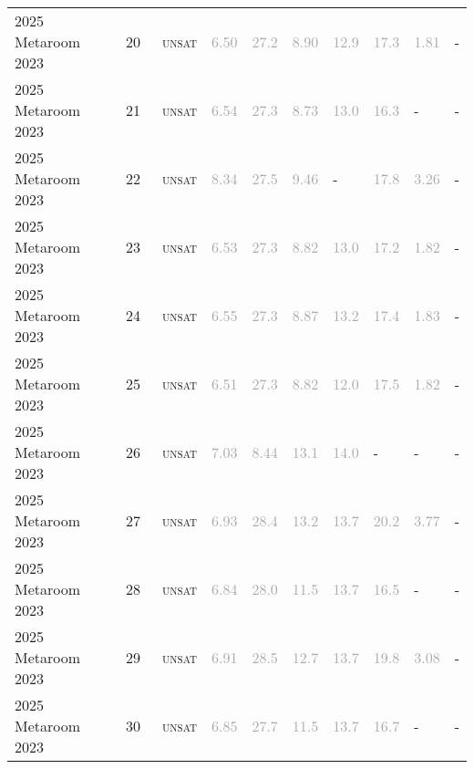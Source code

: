 \begin{center}
{\begin{longtable}{@{}llllllllll@{}}
2025 Metaroom 2023 & 20 & ~\textsc{unsat} & \textcolor{darkgray}{6.50} & \textcolor{darkgray}{27.2} & \textcolor{darkgray}{8.90} & \textcolor{darkgray}{12.9} & \textcolor{darkgray}{17.3} & \textcolor{darkgray}{1.81} & - \\
2025 Metaroom 2023 & 21 & ~\textsc{unsat} & \textcolor{darkgray}{6.54} & \textcolor{darkgray}{27.3} & \textcolor{darkgray}{8.73} & \textcolor{darkgray}{13.0} & \textcolor{darkgray}{16.3} & - & - \\
2025 Metaroom 2023 & 22 & ~\textsc{unsat} & \textcolor{darkgray}{8.34} & \textcolor{darkgray}{27.5} & \textcolor{darkgray}{9.46} & - & \textcolor{darkgray}{17.8} & \textcolor{darkgray}{3.26} & - \\
2025 Metaroom 2023 & 23 & ~\textsc{unsat} & \textcolor{darkgray}{6.53} & \textcolor{darkgray}{27.3} & \textcolor{darkgray}{8.82} & \textcolor{darkgray}{13.0} & \textcolor{darkgray}{17.2} & \textcolor{darkgray}{1.82} & - \\
2025 Metaroom 2023 & 24 & ~\textsc{unsat} & \textcolor{darkgray}{6.55} & \textcolor{darkgray}{27.3} & \textcolor{darkgray}{8.87} & \textcolor{darkgray}{13.2} & \textcolor{darkgray}{17.4} & \textcolor{darkgray}{1.83} & - \\
2025 Metaroom 2023 & 25 & ~\textsc{unsat} & \textcolor{darkgray}{6.51} & \textcolor{darkgray}{27.3} & \textcolor{darkgray}{8.82} & \textcolor{darkgray}{12.0} & \textcolor{darkgray}{17.5} & \textcolor{darkgray}{1.82} & - \\
2025 Metaroom 2023 & 26 & ~\textsc{unsat} & \textcolor{darkgray}{7.03} & \textcolor{darkgray}{8.44} & \textcolor{darkgray}{13.1} & \textcolor{darkgray}{14.0} & - & - & - \\
2025 Metaroom 2023 & 27 & ~\textsc{unsat} & \textcolor{darkgray}{6.93} & \textcolor{darkgray}{28.4} & \textcolor{darkgray}{13.2} & \textcolor{darkgray}{13.7} & \textcolor{darkgray}{20.2} & \textcolor{darkgray}{3.77} & - \\
2025 Metaroom 2023 & 28 & ~\textsc{unsat} & \textcolor{darkgray}{6.84} & \textcolor{darkgray}{28.0} & \textcolor{darkgray}{11.5} & \textcolor{darkgray}{13.7} & \textcolor{darkgray}{16.5} & - & - \\
2025 Metaroom 2023 & 29 & ~\textsc{unsat} & \textcolor{darkgray}{6.91} & \textcolor{darkgray}{28.5} & \textcolor{darkgray}{12.7} & \textcolor{darkgray}{13.7} & \textcolor{darkgray}{19.8} & \textcolor{darkgray}{3.08} & - \\
2025 Metaroom 2023 & 30 & ~\textsc{unsat} & \textcolor{darkgray}{6.85} & \textcolor{darkgray}{27.7} & \textcolor{darkgray}{11.5} & \textcolor{darkgray}{13.7} & \textcolor{darkgray}{16.7} & - & - \\

\end{longtable}}
\end{center}
